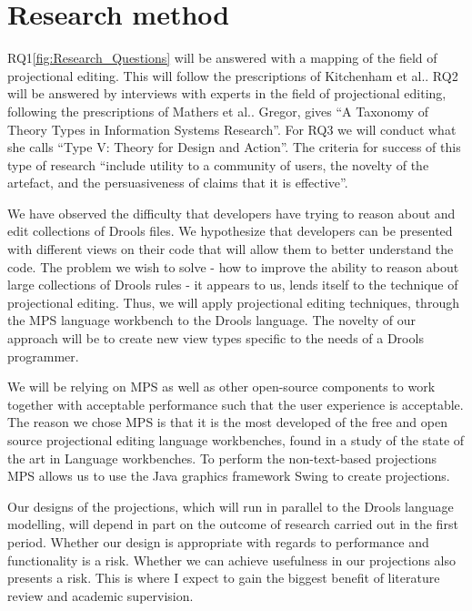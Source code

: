 \section{Research method} 

RQ1\ref{fig:Research_Questions} will be answered with a mapping of the field of projectional editing. 
This will follow the prescriptions of Kitchenham et al.\cite{kitchenham2015evidence}.
RQ2 will be answered by interviews with experts in the field of projectional editing, following the prescriptions of Mathers et al.\cite{mathers1998using}.
Gregor\cite{gregor2006nature}, gives “A Taxonomy of Theory Types in Information Systems Research”. 
For RQ3 we will conduct what she calls “Type V: Theory for Design and Action”. 
The criteria for success of this type of research “include utility to a community of users, the novelty of the artefact, and the persuasiveness of claims that it is effective”.

We have observed the difficulty that developers have trying to reason about and edit collections of Drools files.
We hypothesize that developers can be presented with different views on their code that will allow them to better understand the code.
The problem we wish to solve - how to improve the ability to reason about large collections of Drools rules - it appears to us, lends itself to the technique of projectional editing.
Thus, we will apply projectional editing techniques, through the MPS language workbench to the Drools language.
The novelty of our approach will be to create new view types specific to the needs of a Drools programmer.

We will be relying on MPS as well as other open-source components to work together with acceptable performance such that the user experience is acceptable.
The reason we chose MPS is that it is the most developed of the free and open source projectional editing language workbenches, found in a study of the state of the art in Language workbenches\cite{erdweg2013state}.
To perform the non-text-based projections MPS allows us to use the Java graphics framework Swing to create projections.

Our designs of the projections, which will run in parallel to the Drools language modelling, will depend in part on the outcome of research carried out in the first period.
Whether our design is appropriate with regards to performance and functionality is a risk. 
Whether we can achieve usefulness in our projections also presents a risk.
This is where I expect to gain the biggest benefit of literature review and academic supervision. 

